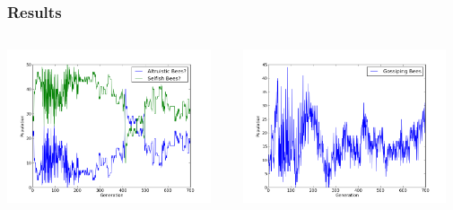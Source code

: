 \documentclass{beamer}
\begin{document}
        \begin{frame}[c]\frametitle{Results}
          \begin{columns}
          \begin{column}{0.48\textwidth}
            \includegraphics[width=6cm]{results/gossip_bees.png}
          \end{column}
        
          \begin{column}{0.48\textwidth}
            \includegraphics[width=6cm]{results/gossip_bees_guiding1.png}
          \end{column}
          \end{columns}
        \end{frame}
\end{document}
